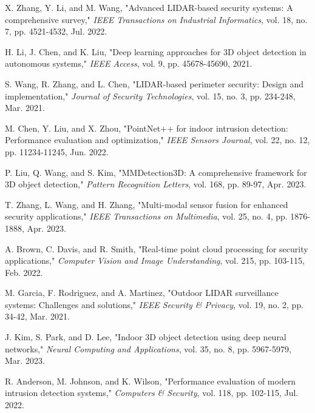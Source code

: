 \documentclass[conference]{IEEEtran}
\begin{document}
\begin{thebibliography}{00}
 X. Zhang, Y. Li, and M. Wang, "Advanced LIDAR-based security systems: A comprehensive survey," \textit{IEEE Transactions on Industrial Informatics}, vol. 18, no. 7, pp. 4521-4532, Jul. 2022.

 H. Li, J. Chen, and K. Liu, "Deep learning approaches for 3D object detection in autonomous systems," \textit{IEEE Access}, vol. 9, pp. 45678-45690, 2021.

 S. Wang, R. Zhang, and L. Chen, "LIDAR-based perimeter security: Design and implementation," \textit{Journal of Security Technologies}, vol. 15, no. 3, pp. 234-248, Mar. 2021.

 M. Chen, Y. Liu, and X. Zhou, "PointNet++ for indoor intrusion detection: Performance evaluation and optimization," \textit{IEEE Sensors Journal}, vol. 22, no. 12, pp. 11234-11245, Jun. 2022.

 P. Liu, Q. Wang, and S. Kim, "MMDetection3D: A comprehensive framework for 3D object detection," \textit{Pattern Recognition Letters}, vol. 168, pp. 89-97, Apr. 2023.

 T. Zhang, L. Wang, and H. Zhang, "Multi-modal sensor fusion for enhanced security applications," \textit{IEEE Transactions on Multimedia}, vol. 25, no. 4, pp. 1876-1888, Apr. 2023.

 A. Brown, C. Davis, and R. Smith, "Real-time point cloud processing for security applications," \textit{Computer Vision and Image Understanding}, vol. 215, pp. 103-115, Feb. 2022.

 M. Garcia, F. Rodriguez, and A. Martinez, "Outdoor LIDAR surveillance systems: Challenges and solutions," \textit{IEEE Security \& Privacy}, vol. 19, no. 2, pp. 34-42, Mar. 2021.

 J. Kim, S. Park, and D. Lee, "Indoor 3D object detection using deep neural networks," \textit{Neural Computing and Applications}, vol. 35, no. 8, pp. 5967-5979, Mar. 2023.

 R. Anderson, M. Johnson, and K. Wilson, "Performance evaluation of modern intrusion detection systems," \textit{Computers \& Security}, vol. 118, pp. 102-115, Jul. 2022.
\end{thebibliography}
\end{document}
